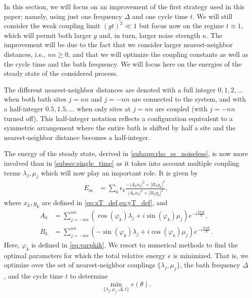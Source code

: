 \documentclass[aps,prx,twocolumn,superscriptaddress,nofootinbib,nolongbibliography,nobalancelastpage,10pt,floatfix]{revtex4-2}
\begin{document}
In this section, we will focus on an improvement of the first strategy used in this paper; namely, using just one frequency $\Delta$ and one cycle time $t$. We will still consider the weak coupling limit $(gt)^2 \ll 1$ but focus now on the regime $t \approx 1$, which will permit both larger $g$ and, in turn, larger noise strength $\kappa$. The improvement will be due to the fact that we consider larger nearest-neighbor distances, i.e., $nn \ge 0$, and that we will optimize the coupling constants as well as the cycle time and the bath frequency. We will focus here on the energies of the steady state of the considered process.

The different nearest-neighbor distances are denoted with a full integer $0,1,2,\ldots$ when both bath sites $j=nn$ and $j=-nn$ are connected to the system, and with a half-integer $0.5,1.5,\ldots$ when only sites at $j=nn$ are coupled (with $j=-nn$ turned off). This half-integer notation reflects a configuration equivalent to a symmetric arrangement where the entire bath is shifted by half a site and the nearest-neighbor distance becomes a half-integer.

The energy of the steady state, derived in \cref{subapp:rho_ss_noiseless}, is now more involved than in \cref{subsec:single_time} as it takes into account multiple coupling terms $\lambda_j, \mu_j$ which will now play an important role. It is given by
\begin{align}
    E_\text{ss} &=\sum_k\epsilon_k\frac{-|A_k x_k|^2+|B_k y_k|^2}{|A_k x_k|^2+|B_k y_k|^2},\label{eq:ss_energy_nn}
\end{align}
where $x_k,y_k$ are defined in \cref{eq:xT_def,eq:yT_def}, and
\begin{align}
    A_k &=\sum_{j=-nn}^{nn}\left(\cos(\varphi_k)\lambda_j+i\sin(\varphi_k)\mu_j\right)e^{-i\frac{2\pi jk}{N}},\\
    B_k &=\sum_{j=-nn}^{nn}\left(-\sin(\varphi_k)\lambda_j+i\cos(\varphi_k)\mu_j\right)e^{-i\frac{2\pi jk}{N}}.
\end{align}
Here, $\varphi_k$ is defined in \cref{eq:varphik}.
We resort to numerical methods to find the optimal parameters for which the total relative energy $e$ is minimized. That is, we optimize over the set of nearest-neighbor couplings $\{\lambda_j,\mu_j\}$, the bath frequency $\Delta$, and the cycle time $t$ to determine
\begin{equation}
    \min_{\{\lambda_j, \mu_j, \Delta, t\}} e(\theta).
    \label{eq:cooling_optimization_procedure}
\end{equation}
\end{document}
